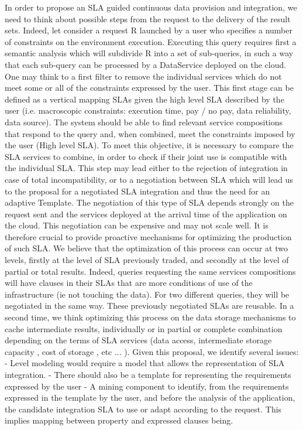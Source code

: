 In order to propose an SLA guided continuous data provision and integration, we need to think about possible steps from the request to the delivery of the result sets. Indeed, let consider a request R launched by a user who specifies a number of constraints on the environment execution. Executing this query requires first a semantic analysis which will subdivide R into a set of sub-queries, in such a way that each sub-query can be processed by a DataService deployed on the cloud. One may think to a first filter to remove the individual services which do not meet some or all of the constraints expressed by the user. This first stage can be defined as a vertical mapping SLAs given the high level SLA described by the user (i.e. macroscopic constraints: execution time, pay / no pay, data reliability, data source). The system should be able to find relevant service compositions that respond to the query and, when combined, meet the constraints imposed by the user (High level SLA).
To meet this objective, it is necessary to compare the SLA services to combine, in order to check if their joint use is compatible with the individual SLA. This step may lead either to the rejection of integration in case of total incompatibility, or to a negotiation between SLA which will lead us to the proposal for a negotiated SLA integration and thus the need for an adaptive Template.
The negotiation of this type of SLA depends strongly on the request sent and the services deployed at the arrival time of the application on the cloud. This negotiation can be expensive and may not scale well. It is therefore crucial to provide proactive mechanisms for optimizing the production of such SLA. We believe that the optimization of this process can occur at two levels, firstly at the level of SLA previously traded, and secondly at the level of partial or total results. Indeed, queries requesting the same services compositions will have clauses in their SLAs that are more conditions of use of the infrastructure (ie not touching the data). For two different queries, they will be negotiated in the same way. These previously negotiated SLAs are reusable.
In a second time, we think optimizing this process on the data storage mechanisms to cache intermediate results, individually or in partial or complete combination depending on the terms of SLA services (data access, intermediate storage capacity , cost of storage , etc ... ).
Given this proposal, we identify several issues:
- Level modeling would require a model that allows the representation of SLA integration.
- There should also be a template for representing the requirements expressed by the user
- A mining component to identify, from the requirements expressed in the template by the user, and before the analysis of the application, the candidate integration SLA to use or adapt according to the request. This implies mapping between property and expressed clauses being.

